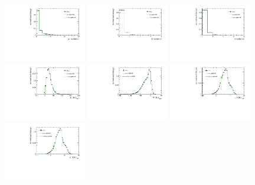 \begin{figure}[!hb]
 \includegraphics[width=0.32\textwidth]{figs/kpimm/data-mc/bdt/Muminus_isolation_V2_15.pdf}
 \includegraphics[width=0.32\textwidth]{figs/kpimm/data-mc/bdt/kaon_isolation.pdf}
 \includegraphics[width=0.32\textwidth]{figs/kpimm/data-mc/bdt/pion_isolation.pdf}
 \includegraphics[width=0.32\textwidth]{figs/kpimm/data-mc/bdt/K_PIDK.pdf}
 \includegraphics[width=0.32\textwidth]{figs/kpimm/data-mc/bdt/Pi_PIDK.pdf}
 \includegraphics[width=0.32\textwidth]{figs/kpimm/data-mc/bdt/Muplus_PIDmu.pdf}
 \includegraphics[width=0.32\textwidth]{figs/kpimm/data-mc/bdt/Muminus_PIDmu.pdf}
 

\end{figure}
